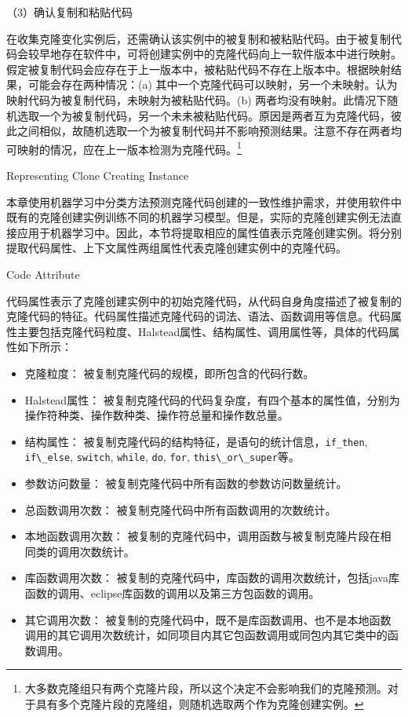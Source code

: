 （3）确认复制和粘贴代码

在收集克隆变化实例后，还需确认该实例中的被复制和被粘贴代码。由于被复制代码会较早地存在软件中，可将创建实例中的克隆代码向上一软件版本中进行映射。假定被复制代码会应存在于上一版本中，被粘贴代码不存在上版本中。根据映射结果，可能会存在两种情况：(a) 其中一个克隆代码可以映射，另一个未映射。认为映射代码为被复制代码，未映射为被粘贴代码。(b) 两者均没有映射。此情况下随机选取一个为被复制代码，另一个未未被粘贴代码。原因是两者互为克隆代码，彼此之间相似，故随机选取一个为被复制代码并不影响预测结果。注意不存在两者均可映射的情况，应在上一版本检测为克隆代码。\footnote{大多数克隆组只有两个克隆片段，所以这个决定不会影响我们的克隆预测。对于具有多个克隆片段的克隆组，则随机选取两个作为克隆创建实例。}


{Representing Clone Creating Instance}
\label{lab-creatingattribute}

本章使用机器学习中分类方法预测克隆代码创建的一致性维护需求，并使用软件中既有的克隆创建实例训练不同的机器学习模型。但是，实际的克隆创建实例无法直接应用于机器学习中。因此，本节将提取相应的属性值表示克隆创建实例。将分别提取代码属性、上下文属性两组属性代表克隆创建实例中的克隆代码。

{Code Attribute}

代码属性表示了克隆创建实例中的初始克隆代码，从代码自身角度描述了被复制的克隆代码的特征。代码属性描述克隆代码的词法、语法、函数调用等信息。代码属性主要包括克隆代码粒度、Halstead属性、结构属性、调用属性等，具体的代码属性如下所示：

\begin{itemize}
\item 
克隆粒度：
被复制克隆代码的规模，即所包含的代码行数。
\item 
Halstead属性：
被复制克隆代码的代码复杂度，有四个基本的属性值，分别为操作符种类、操作数种类、操作符总量和操作数总量。
\item  
结构属性：
被复制克隆代码的结构特征，是语句的统计信息，\verb+if_then+, \verb+if\_else+, \verb+switch+, \verb+while+, \verb+do+, \verb+for+,  \verb+this\_or\_super+等。
\item  
参数访问数量：
被复制克隆代码中所有函数的参数访问数量统计。
\item  
总函数调用次数：
被复制克隆代码中所有函数调用的次数统计。
\item  
本地函数调用次数：
被复制的克隆代码中，调用函数与被复制克隆片段在相同类的调用次数统计。
\item  
库函数调用次数：
被复制的克隆代码中，库函数的调用次数统计，包括java库函数的调用、eclipse库函数的调用以及第三方包函数的调用。
\item  
其它调用次数：
被复制的克隆代码中，既不是库函数调用、也不是本地函数调用的其它调用次数统计，如同项目内其它包函数调用或同包内其它类中的函数调用。
\end{itemize}

